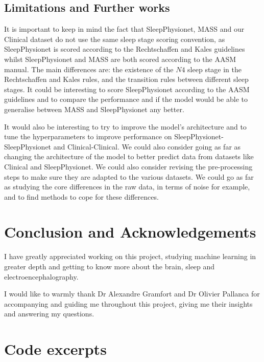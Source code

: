 \documentclass[titlepage, 11pt, a4paper, fancysections]{article}
\begin{document}
\subsection{Limitations and Further works}

It is important to keep in mind the fact that SleepPhysionet, MASS and our Clinical dataset do not use the same sleep stage scoring convention, as SleepPhysionet is scored according to the Rechtschaffen and Kales guidelines whilst SleepPhysionet and MASS are both scored according to the AASM manual. The main differences are: the existence of the $N4$ sleep stage in the Rechtschaffen and Kales rules, and the transition rules between different sleep stages. It could be interesting to score SleepPhysionet according to the AASM guidelines and to compare the performance and if the model would be able to generalise between MASS and SleepPhysionet any better. 

It would also be interesting to try to improve the model's architecture and to tune the hyperparameters to improve performance on SleepPhysionet-SleepPhysionet and Clinical-Clinical. We could also consider going as far as changing the architecture of the model to better predict data from datasets like Clinical and SleepPhysionet. We could also consider revising the pre-processing steps to make sure they are adapted to the various datasets.
We could go as far as studying the core differences in the raw data, in terms of noise for example, and to find methods to cope for these differences. 

\section{Conclusion and Acknowledgements}
I have greatly appreciated working on this project, studying machine learning in greater depth and getting to know more about the brain, sleep and electroencephalography. 

I would like to warmly thank Dr Alexandre Gramfort and Dr Olivier Pallanca for accompanying and guiding me throughout this project, giving me their insights and answering my questions. 

\newpage

\section*{Code excerpts}
\begin{multicols}{2}
    
    
\end{multicols}

\newpage 
{}
\printbibliography

\listoffigures
\listoftables
\newpage
\end{document}
